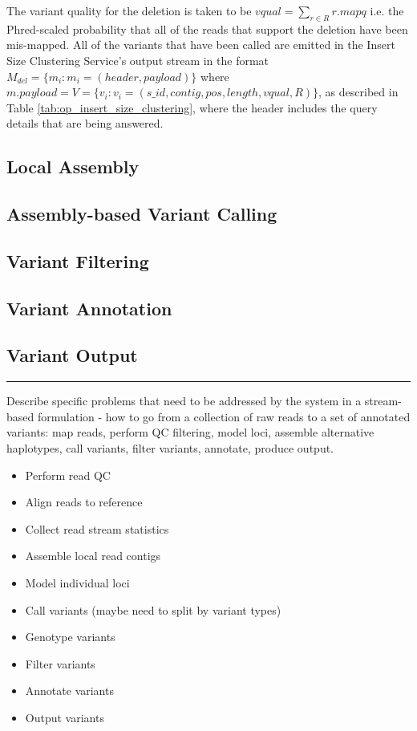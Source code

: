 The variant quality for the deletion is taken to be $vqual = \sum_{r \in R}{r.mapq}$ i.e. the Phred-scaled probability that all of the reads that support the deletion have been mis-mapped. All of the variants that have been called are emitted in the Insert Size Clustering Service's output stream in the format $M_{del} = \{m_i: m_i = (header, payload)\}$ where $m.payload = V = \{v_i: v_i = (s\_id, contig, pos, length, vqual, R)\}$, as described in Table \ref{tab:op_insert_size_clustering}, where the header includes the query details that are being answered.


\subsection{Local Assembly}

\subsection{Assembly-based Variant Calling}

\subsection{Variant Filtering}

\subsection{Variant Annotation}

\subsection{Variant Output}

\hrule
Describe specific problems that need to be addressed by the system in a stream-based formulation - how to go from a collection of raw reads to a set of annotated variants: map reads, perform QC filtering, model loci, assemble alternative haplotypes, call variants, filter variants, annotate, produce output.  


\begin{itemize}
    \item Perform read QC
    \item Align reads to reference
    \item Collect read stream statistics
    \item Assemble local read contigs
    \item Model individual loci
    \item Call variants (maybe need to split by variant types)
    \item Genotype variants
    \item Filter variants
    \item Annotate variants
    \item Output variants
\end{itemize}



